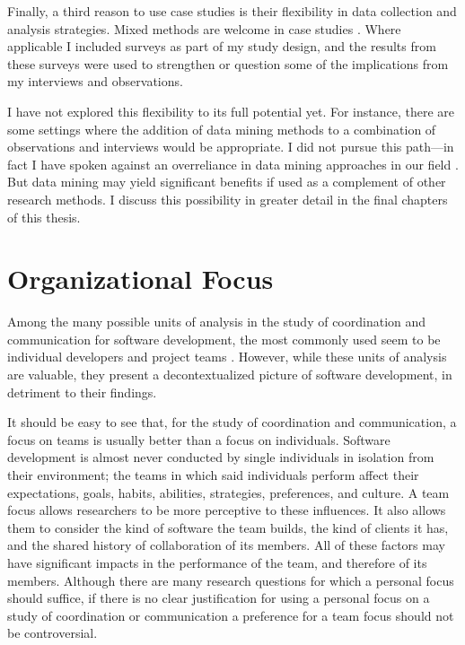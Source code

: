 Finally, a third reason to use case studies is their flexibility in data collection and analysis strategies. Mixed methods are welcome in case studies \cite{Yin2003}. Where applicable I included surveys as part of my study design, and the results from these surveys were used to strengthen or question some of the implications from my interviews and observations.

I have not explored this flexibility to its full potential yet. For instance, there are some settings where the addition of data mining methods to a combination of observations and interviews would be appropriate. I did not pursue this path---in fact I have spoken against an overreliance in data mining approaches in our field \cite{Aranda2009}. But data mining may yield significant benefits if used as a complement of other research methods. I discuss this possibility in greater detail in the final chapters of this thesis.


\section{Organizational Focus}

Among the many possible units of analysis in the study of coordination and communication for software development, the most commonly used seem to be individual developers \cite{Ko2007} and project teams \cite{Teasley2002}. However, while these units of analysis are valuable, they present a decontextualized picture of software development, in detriment to their findings.

It should be easy to see that, for the study of coordination and communication, a focus on teams is usually better than a focus on individuals. Software development is almost never conducted by single individuals in isolation from their environment; the teams in which said individuals perform affect their expectations, goals, habits, abilities, strategies, preferences, and culture. A team focus allows researchers to be more perceptive to these influences. It also allows them to consider the kind of software the team builds, the kind of clients it has, and the shared history of collaboration of its members. All of these factors may have significant impacts in the performance of the team, and therefore of its members. Although there are many research questions for which a personal focus should suffice, if there is no clear justification for using a personal focus on a study of coordination or communication a preference for a team focus should not be controversial.

